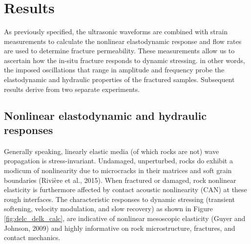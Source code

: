 
\section{Results}
\paragraph{}
As previously specified, the ultrasonic waveforms are combined with strain measurements to calculate the nonlinear elastodynamic response and flow rates are used to determine fracture permeability. These measurements allow us to ascertain how the in-situ fracture responds to dynamic stressing. in other words, the imposed oscillations that range in amplitude and frequency probe the elastodynamic and hydraulic properties of the fractured samples. Subsequent results derive from two separate experiments. 

\subsection{Nonlinear elastodynamic and hydraulic responses}
\paragraph{}
Generally speaking, linearly elastic media (of which rocks are not) wave propagation is stress-invariant. Undamaged, unperturbed, rocks do exhibit a modicum of nonlinearity due to microcracks in their matrices and soft grain boundaries (Rivière et al., 2015). When fractured or damaged, rock nonlinear elasticity is furthermore affected by contact acoustic nonlinearity (CAN) at these rough interfaces. The characteristic responses to dynamic stressing (transient softening, velocity modulation, and slow recovery) as shown in Figure \ref{fig:delc_delk_calc}, are indicative of nonlinear mesoscopic elasticity (Guyer and Johnson, 2009) and highly informative on rock microstructure, fractures, and contact mechanics.

